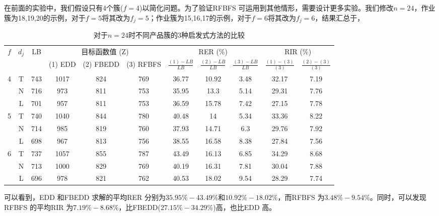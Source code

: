 在前面的实验中，我们假设只有4个簇($f=4$)以简化问题。为了验证RFBFS 可运用到其他情形，需要设计更多实验。我们修改$n=24$，作业簇为18,19,20的示例，对于$f = 5$将其改为$f_j=5$；作业簇为15,16,17的示例，对于$f = 6$将其改为$f_j=6$，结果汇总于，
\begin{table}[h]
  \centering\xiaowu
  \caption{对于$n=24$时不同产品簇的3种启发式方法的比较\label{tab:n=24compare}}
    \begin{tabular}{ccccccccccc}
    \toprule
    \multirow{2}[4]{*}{$f$} & \multirow{2}[4]{*}{$d_j$} & \multirow{2}[4]{*}{LB} & \multicolumn{3}{c}{目标函数值 (Z)} & \multicolumn{3}{c}{RER (\%)} & \multicolumn{2}{c}{RIR (\%)} \\
    \cmidrule(lr){4-6}\cmidrule(lr){7-9}\cmidrule(lr){10-11}
          &       &       & (1) EDD & (2) FBEDD & (3) RFBFS & $\frac{(1) - LB}{LB}$ & $\frac{(2) - LB}{LB}$ &\parbox[c][8mm]{0pt}{}  $\frac{(3) - LB}{LB}$ &$\frac{(1) - (3)}{(3)}$ & $\frac{(2) - (3)}{(3)}$\\
          \midrule
    [1]{*}{4} & T     & 743   & 1017  & 824   & 769   & 36.77 & 10.92 & 3.48  & 32.17 & 7.19 \\
          & N     & 716   & 973   & 811   & 753   & 35.95 & 13.3  & 5.14  & 29.31 & 7.76 \\
          & L     & 701   & 957   & 811   & 753   & 36.59 & 15.78 & 7.42  & 27.15 & 7.78 \\[3pt]
    [0]{*}{5} & T     & 740   & 1040  & 844   & 780   & 40.48 & 14    & 5.34  & 33.36 & 8.22 \\
          & N     & 714   & 985   & 819   & 760   & 37.93 & 14.71 & 6.3   & 29.76 & 7.92 \\
          & L     & 698   & 967   & 813   & 756   & 38.55 & 16.58 & 8.38  & 27.84 & 7.56 \\[3pt]
    [1]{*}{6} & T     & 737   & 1057  & 855   & 787   & 43.49 & 16.13 & 6.85  & 34.29 & 8.68 \\
          & N     & 713   & 1000  & 829   & 769   & 40.19 & 16.31 & 7.81  & 30.04 & 7.88 \\
          & L     & 696   & 978   & 821   & 762   & 40.53 & 18.02 & 9.54  & 28.29 & 7.74 \\
    \bottomrule
    \end{tabular}
\end{table}
可以看到，EDD 和FBEDD 求解的平均RER 分别为$35.95\% - 43.49\%$和$10.92\% - 18.02\%$，而RFBFS 为$3.48\% - 9.54\%$。同时，可以发现RFBFS 的平均RIR 为$7.19\% - 8.68\%$，比FBEDD($27.15\% - 34.29\%$)高，也比EDD 高。
